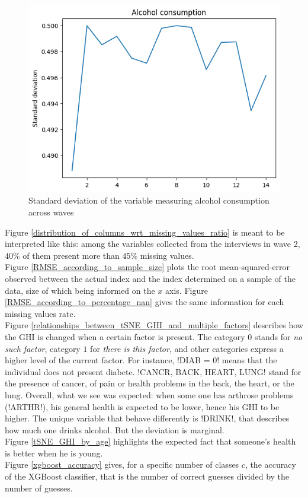 \documentclass[]{article}
\begin{document}
\begin{figure}[!h]
	\centering
	\includegraphics[scale = 0.75]{std_alcohol.png}
	\caption{Standard deviation of the variable measuring alcohol consumption across waves}
	\label{std_alcohol}
\end{figure}
\noindent
Figure \ref{distribution_of_columns_wrt_missing_values_ratio} is meant to be interpreted like this: among the variables collected from the interviews in wave 2, $40$\% of them present more than $45$\% missing values.\\

\noindent
Figure \ref{RMSE_according_to_sample_size} plots the root mean-squared-error observed between the actual index and the index determined on a sample of the data, size of which being informed on the $x$ axis. Figure \ref{RMSE_according_to_percentage_nan} gives the same information for each missing values rate.\\

\noindent
Figure \ref{relationships_between_tSNE_GHI_and_multiple_factors} describes how the GHI is changed when a certain factor is present. The category $0$ stands for \textit{no such factor}, category $1$ for \textit{there is this factor}, and other categories express a higher level of the current factor. For instance, \pyth!DIAB = 0! means that the individual does not present diabete. \pyth!CANCR, BACK, HEART, LUNG! stand for the presence of cancer, of pain or health problems in the back, the heart, or the lung. Overall, what we see was expected: when some one has arthrose problems (\pyth!ARTHR!), his general health is expected to be lower, hence his GHI to be higher. The unique variable that behave differently is \pyth!DRINK!, that describes how much one drinks alcohol. But the deviation is marginal.\\

\noindent
Figure \ref{tSNE_GHI_by_age} highlights the expected fact that someone's health is better when he is young.\\

\noindent
Figure \ref{xgboost_accuracy} gives, for a specific number of classes $c$, the accuracy of the XGBoost classifier, that is the number of correct guesses divided by the number of guesses.

\cleardoublepage


\end{document}
